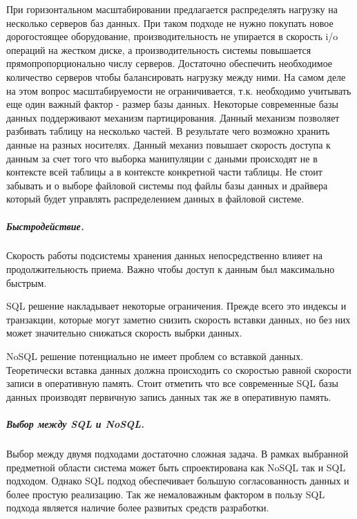 При горизонтальном масштабировании предлагается распределять нагрузку на
несколько серверов баз данных. При таком подходе не нужно покупать новое
дорогостоящее оборудование, производительность не упирается в скорость i/o
операций на жестком диске, а производительность системы повышается
прямопропорционально числу серверов. Достаточно обеспечить необходимое
количество серверов чтобы балансировать нагрузку между ними.
На самом деле на этом вопрос масштабируемости не ограничивается, т.к. необходимо
учитывать еще один важный фактор - размер базы данных. Некоторые современные
базы данных поддерживают механизм партицирования. Данный механизм позволяет
разбивать таблицу на несколько частей. В результате чего возможно хранить данные
на разных носителях. Данный механиз повышает скорость доступа к данным за счет
того что выборка манипуляции с даными происходят не в контексте всей таблицы а в
контексте конкретной части таблицы. Не стоит забывать и о выборе файловой
системы под файлы базы данных и драйвера который будет управлять распределением
данных в файловой системе.
\subparagraph{Быстродействие.} 

Скорость работы подсистемы хранения данных непосредственно влияет на
продолжительность приема. Важно чтобы доступ к данным был максимально быстрым.

SQL решение накладывает некоторые ограничения. Прежде всего это индексы и
транзакции, которые могут заметно снизить скорость вставки данных, но без них
может значительно снижаться скорость выбрки данных.

NoSQL решение потенциально не имеет проблем со вставкой данных. Теоретически
вставка данных должна происходить со скоростью равной скорости записи в
оперативную память. Стоит отметить что все современные SQL базы данных
производят первичную запись данных так же в оперативную память.

\subparagraph{Выбор между SQL и NoSQL.}
Выбор между двумя подходами достаточно сложная задача. В рамках выбранной
предметной области система может быть спроектирована как NoSQL так и SQL
подходом. Однако SQL подход обеспечивает большую согласованность данных и более
простую реализацию. Так же немаловажным фактором в пользу SQL подхода является
наличие более развитых средств разработки.



